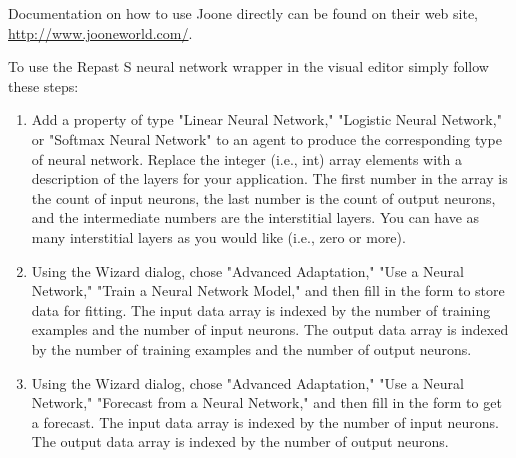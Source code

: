 \documentclass[11pt]{article}
\begin{document}
Documentation on how to use Joone directly can be found on their web site, \url{http://www.jooneworld.com/}.

To use the Repast S neural network wrapper in the visual editor simply follow these steps:
\begin{enumerate}
\item Add a property of type "Linear Neural Network," "Logistic Neural Network," or "Softmax Neural Network" to an agent to produce the corresponding type of neural network. Replace the integer (i.e., int) array elements with a description of the layers for your application. The first number in the array is the count of input neurons, the last number is the count of output neurons, and the intermediate numbers are the interstitial layers. You can have as many interstitial layers as you would like (i.e., zero or more).
\item Using the Wizard dialog, chose "Advanced Adaptation," "Use a Neural Network," "Train a Neural Network Model," and then fill in the form to store data for fitting. The input data array is indexed by the number of training examples and the number of input neurons. The output data array is indexed by the number of training examples and the number of output neurons.
\item Using the Wizard dialog, chose "Advanced Adaptation," "Use a Neural Network," "Forecast from a Neural Network," and then fill in the form to get a forecast. The input data array is indexed by the number of input neurons. The output data array is indexed by the number of output neurons.
\end{enumerate}
\end{document}
